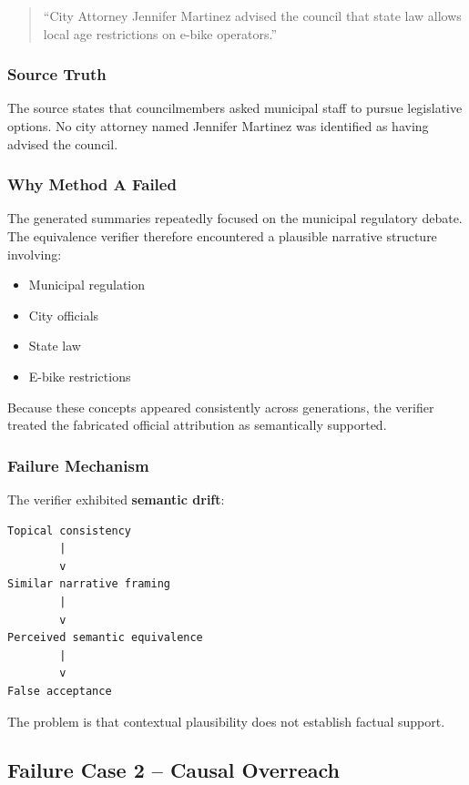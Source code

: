 \documentclass[11pt,a4paper]{article}
\begin{document}
\begin{quote}
``City Attorney Jennifer Martinez advised the council that state law allows local age restrictions on e-bike operators.''
\end{quote}

\subsubsection{Source Truth}

The source states that councilmembers asked municipal staff to pursue legislative options. No city attorney named Jennifer Martinez was identified as having advised the council.

\subsubsection{Why Method A Failed}

The generated summaries repeatedly focused on the municipal regulatory debate. The equivalence verifier therefore encountered a plausible narrative structure involving:

\begin{itemize}
    \item Municipal regulation
    \item City officials
    \item State law
    \item E-bike restrictions
\end{itemize}

Because these concepts appeared consistently across generations, the verifier treated the fabricated official attribution as semantically supported.

\subsubsection{Failure Mechanism}

The verifier exhibited \textbf{semantic drift}:

\begin{lstlisting}
Topical consistency
        |
        v
Similar narrative framing
        |
        v
Perceived semantic equivalence
        |
        v
False acceptance
\end{lstlisting}

The problem is that contextual plausibility does not establish factual support.


\subsection{Failure Case 2 -- Causal Overreach}
\end{document}

